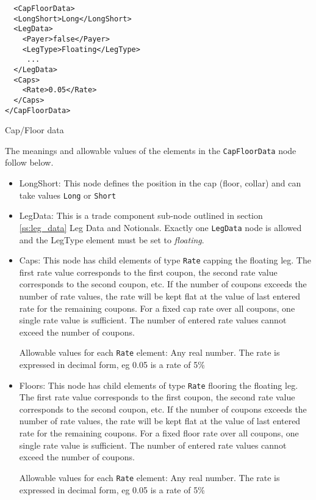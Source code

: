 \begin{listing}[H]
\begin{verbatim}
  <CapFloorData>
  <LongShort>Long</LongShort>
  <LegData>
    <Payer>false</Payer>
    <LegType>Floating</LegType>
     ...
  </LegData>
  <Caps>
    <Rate>0.05</Rate>
  </Caps>
</CapFloorData>
\end{verbatim}
\caption{Cap/Floor data}
\label{lst:capfloor_data}
\end{listing}

The meanings and allowable values of the elements in the \lstinline!CapFloorData!  node follow below.

\begin{itemize}

\item LongShort: This node defines the position in the cap (floor, collar) and can take values \lstinline!Long! or
  \lstinline!Short!

\item LegData: This is a trade component sub-node outlined in section \ref{ss:leg_data} Leg Data and Notionals. Exactly
  one \lstinline!LegData! node is allowed and the LegType element must be set to \emph{floating}.

\item Caps: This node has child elements of type \lstinline!Rate!
  capping the floating leg. The first rate value corresponds to the
  first coupon, the second rate value corresponds to the second
  coupon, etc. If the number of coupons exceeds the number of rate
  values, the rate will be kept flat at the value of last entered rate
  for the remaining coupons. For a fixed cap rate over all coupons,
  one single rate value is sufficient. The number of entered rate
  values cannot exceed the number of coupons. 

  Allowable values for each \lstinline!Rate! element: Any real number. The rate is expressed in decimal form, eg 0.05 is
  a rate of 5\%

\item Floors: This node has child elements of type
  \lstinline!Rate! flooring the floating leg.  The first rate value
  corresponds to the first coupon, the second rate value corresponds
  to the second coupon, etc. If the number of coupons exceeds the
  number of rate values, the rate will be kept flat at the value of
  last entered rate for the remaining coupons. For a fixed floor rate
  over all coupons, one single rate value is sufficient. The number of
  entered rate values cannot exceed the number of coupons.

  Allowable values for each \lstinline!Rate! element: Any real number. The rate is expressed in decimal form, eg 0.05 is
  a rate of 5\%

\end{itemize}

